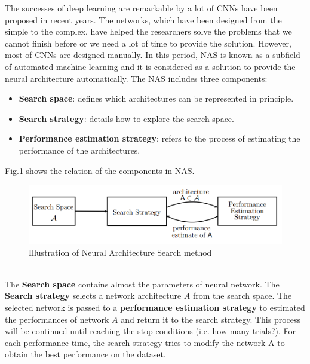 \documentclass[12pt,a4paper]{article}
\begin{document}
The successes of deep learning are remarkable by a lot of CNNs have been proposed in recent years. The networks, which have been designed from the simple to the complex, have helped the researchers solve the problems that we cannot finish before or we need a lot of time to provide the solution. However, most of CNNs are designed manually. In this period, NAS \cite{elsken2018neural} is known as a subfield of automated machine learning and it is considered as a solution to provide the neural architecture automatically. The NAS includes three components:
\begin{itemize}
	\item \textbf{Search space}: defines which architectures can be represented in principle.
	\item \textbf{Search strategy}: details how to explore the search space.
	\item \textbf{Performance estimation strategy}: refers to the process of estimating the performance of the architectures.
\end{itemize}
Fig.\ref{nas} shows the relation of the components in NAS.
\begin{figure}[h!]
	\centering
	\includegraphics[scale=0.5]{images/nas/nas_components}
	\caption{Illustration of Neural Architecture Search method}
	\label{nas}
\end{figure}\\
The \textbf{Search space} contains almost the parameters of neural network. The \textbf{Search strategy} selects a network architecture $A$ from the search space. The selected network is passed to a \textbf{performance estimation strategy} to estimated the performances of network $A$ and return it to the search strategy. This process will be continued until reaching the stop conditions (i.e. how many trials?). For each performance time, the search strategy tries to modify the network A to obtain the best performance on the dataset.
\end{document}
